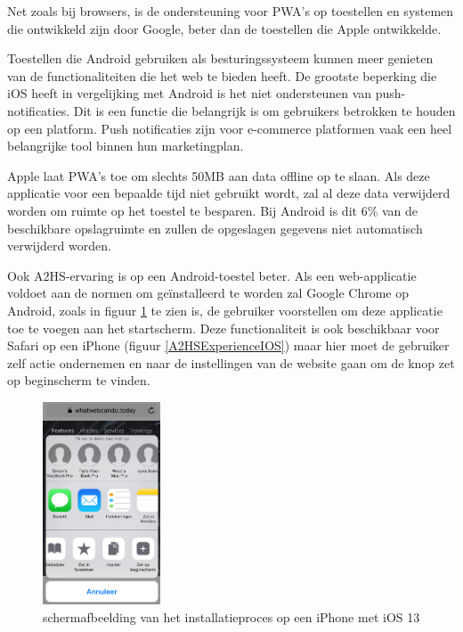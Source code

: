 		Net zoals bij browsers, is de ondersteuning voor PWA's op toestellen en systemen die ontwikkeld zijn door Google, beter dan de toestellen die Apple ontwikkelde.
		
		Toestellen die Android gebruiken als besturingssysteem kunnen meer genieten van de functionaliteiten die het web te bieden heeft.
		De grootste beperking die iOS heeft in vergelijking met Android is het niet ondersteunen van push-notificaties. Dit is een functie die belangrijk is om gebruikers betrokken te houden op een platform. Push notificaties zijn voor e-commerce platformen vaak een heel belangrijke tool binnen hun marketingplan.
		\autocite{Anastasia2017}
		
		Apple laat PWA's toe om slechts 50MB aan data offline op te slaan. Als deze applicatie voor een bepaalde tijd niet gebruikt wordt, zal al deze data verwijderd worden om ruimte op het toestel te besparen. Bij Android is dit 6\% van de beschikbare opslagruimte en zullen de opgeslagen gegevens niet automatisch verwijderd worden.
		
		Ook A2HS-ervaring is op een Android-toestel beter. Als een web-applicatie voldoet aan de normen om geïnstalleerd te worden zal Google Chrome op Android, zoals in figuur \ref{A2HSExperienceAndroid} te zien is, de gebruiker voorstellen om deze applicatie toe te voegen aan het startscherm. Deze functionaliteit is ook beschikbaar voor Safari op een iPhone (figuur \ref{A2HSExperienceIOS}) maar hier moet de gebruiker zelf actie ondernemen en naar de instellingen van de website gaan om de knop zet op beginscherm te vinden.
		
		\begin{figure}[H]
			\centering
			\includegraphics[width=35mm]{./img/installation_iOS.png}
			\caption{schermafbeelding van het installatieproces op een iPhone met iOS 13}
			\label{A2HSExperienceAndroid}
		\end{figure}
		
